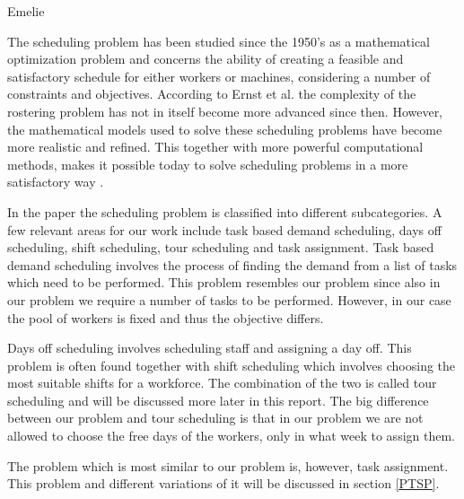 Emelie

The scheduling problem has been studied since the 1950's as a mathematical optimization problem and concerns the ability of creating a feasible and satisfactory schedule for either workers or machines, considering a number of constraints and objectives. According to Ernst et al. the complexity of the rostering problem has not in itself become more advanced since then. However, the mathematical models used to solve these scheduling problems have become more realistic and refined. This together with more powerful computational methods, makes it possible today to solve scheduling problems in a more satisfactory way \cite{Ernst_2004}.

In the paper \cite{Ernst_2004} the scheduling problem is classified into different subcategories. A few relevant areas for our work include task based demand scheduling, days off scheduling, shift scheduling, tour scheduling and task assignment. Task based demand scheduling involves the process of finding the demand from a list of tasks which need to be performed. This problem resembles our problem since also in our problem we require a number of tasks to be performed. However, in our case the pool of workers is fixed and thus the objective differs. 
	
Days off scheduling involves scheduling staff and assigning a day off. This problem is often found together with shift scheduling which involves choosing the most suitable shifts for a workforce. The combination of the two is called tour scheduling and will be discussed more later in this report. The big difference between our problem and tour scheduling is that in our problem we are not allowed to choose the free days of the workers, only in what week to assign them.

The problem which is most similar to our problem is, however, task assignment. This problem and different variations of it will be discussed in section \ref{PTSP}.

\iffalse
 (The Use of Mathematical Models in Plant Maintenance Decision Making, 1967) In surveys such as "An Annotated Bibliography of Personnel Scheduling
and Rostering" Ernst et al. 2004,  covers papers from 1954. The bibliography covers the most important contributions to the area of scheduling up to the year 2004 and divides the area into different subcategories. Below, we have identified the most relevant areas of scheduling in relation to the problem at hand.
\fi

